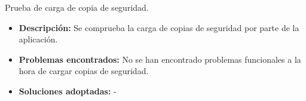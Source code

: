 \item Prueba de carga de copia de seguridad.
  \begin{itemize}
    \item \textbf{Descripción:} Se comprueba la carga de copias de seguridad
    por parte de la aplicación.
    \item \textbf{Problemas encontrados:} No se han encontrado problemas
    funcionales a la hora de cargar copias de seguridad.
    \item \textbf{Soluciones adoptadas:} -
  \end{itemize}
